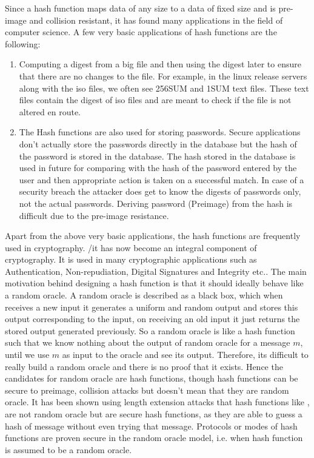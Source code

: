 Since a hash function maps data of any size to a data of fixed size and is pre-image and collision resistant, it has found many applications in the field of computer science. A few very basic applications of hash functions are the following:
\begin{enumerate}
	\item Computing a digest from a big file and then using the digest later to ensure that there are no changes to the file. For example, in the linux release servers along with the iso files, we often see \SHA256SUM and \SHA1SUM text files. These text files contain the digest of iso files and are meant to check if the file is not altered en route.
	
	\item The Hash functions are also used for storing passwords. Secure applications don't actually store the passwords directly in the database but the hash of the password is stored in the database. The hash stored in the database is used in future for comparing with the hash of the password entered by the user and then appropriate action is taken on a successful match. In case of a security breach the attacker does get to know the digests of passwords only, not the actual passwords. Deriving password (Preimage) from the hash is difficult due to the pre-image resistance.
\end{enumerate}

Apart from the above very basic applications, the hash functions are frequently used in cryptography. /it has now become an integral component of cryptography. It is used in many cryptographic applications such as Authentication, Non-repudiation, Digital Signatures and Integrity etc.. The main motivation behind designing a hash function is that it should ideally behave like a random oracle. A random oracle is described as a black box, which when receives a new input it generates a uniform and random output and stores this output corresponding to the input, on receiving an old input it just returns the stored output generated previously. So a random oracle is like a hash function such that we know nothing about the output of random oracle for a message $m$, until we use $m$ as input to the oracle and see its output. Therefore, its difficult to really build a random oracle and there is no proof that it exists. Hence the candidates for random oracle are hash functions, though hash functions can be secure to preimage, collision attacks but doesn't mean that they are random oracle. It has been shown using length extension attacks that hash functions like ,  are not random oracle but are secure hash functions, as they are able to guess a hash of message without even trying that message. Protocols or modes of hash functions are proven secure in the random oracle model, i.e. when hash function is assumed to be a random oracle.

